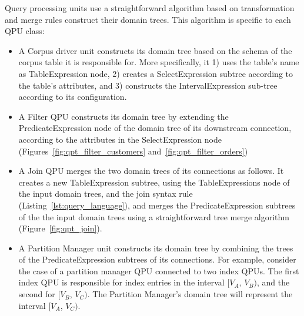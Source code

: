 Query processing units use a straightforward algorithm based on transformation and merge rules construct their domain trees.
This algorithm is specific to each QPU class:
\begin{itemize}
  \item A Corpus driver unit constructs its domain tree based on the schema of the corpus table it is responsible for.
  More specifically,
  it 1) uses the table's name as TableExpression node,
  2) creates a SelectExpression subtree according to the table's attributes,
  and 3) constructs the IntervalExpression sub-tree according to its configuration.

  \item A Filter QPU constructs its domain tree by extending the PredicateExpression node of the domain tree of its
  downstream connection, according to the attributes in the SelectExpression node
  (Figures~\ref{fig:qpt_filter_customers} and~\ref{fig:qpt_filter_orders})

  \item A Join QPU merges the two domain trees of its connections as follows.
  It creates a new TableExpression subtree, using the TableExpressions node of the input domain trees, and the
  join syntax rule (Listing~\ref{lst:query_language}),
  and merges the PredicateExpression subtrees of the the input domain trees using a straightforward tree merge algorithm
  (Figure~\ref{fig:qpt_join}).

  \item A Partition Manager unit constructs its domain tree by combining the trees of the PredicateExpression subtrees
  of its connections.
  For example, consider the case of a partition manager QPU connected to two index QPUs.
  The first index QPU is responsible for index entries in the interval $[V_A$, $V_B)$,
  and the second for $[V_B$, $V_C)$.
  The Partition Manager's domain tree will represent the interval $[V_A$, $V_C)$.
\end{itemize}

